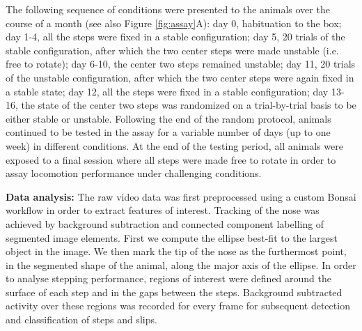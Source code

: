 The following sequence of conditions were presented to the animals over the course of a month (see also Figure \ref{fig:assay}A): day 0, habituation to the box; day 1-4, all the steps were fixed in a stable configuration; day 5, 20 trials of the stable configuration, after which the two center steps were made unstable (i.e. free to rotate); day 6-10, the center two steps remained unstable; day 11, 20 trials of the unstable configuration, after which the two center steps were again fixed in a stable state; day 12, all the steps were fixed in a stable configuration; day 13-16, the state of the center two steps was randomized on a trial-by-trial basis to be either stable or unstable. Following the end of the random protocol, animals continued to be tested in the assay for a variable number of days (up to one week) in different conditions. At the end of the testing period, all animals were exposed to a final session where all steps were made free to rotate in order to assay locomotion performance under challenging conditions.

\textbf{Data analysis:} The raw video data was first preprocessed using a custom Bonsai workflow in order to extract features of interest. Tracking of the nose was achieved by background subtraction and connected component labelling of segmented image elements. First we compute the ellipse best-fit to the largest object in the image. We then mark the tip of the nose as the furthermost point, in the segmented shape of the animal, along the major axis of the ellipse. In order to analyse stepping performance, regions of interest were defined around the surface of each step and in the gaps between the steps. Background subtracted activity over these regions was recorded for every frame for subsequent detection and classification of steps and slips.

